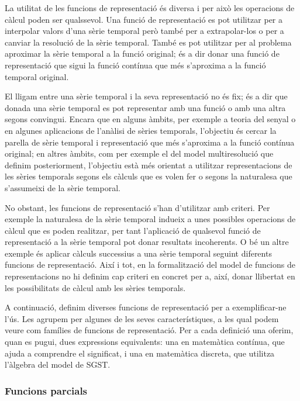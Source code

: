 La utilitat de les funcions de representació és diversa i per això les
operacions de càlcul poden ser qualssevol. Una funció de
representació es pot utilitzar per a interpolar valors d'una sèrie
temporal però també per a extrapolar-los o per a canviar la resolució
de la sèrie temporal. També es pot utilitzar per al problema aproximar
la sèrie temporal a la funció original; és a dir donar una funció de
representació que sigui la funció contínua que més s'aproxima a la
funció temporal original.


El lligam entre una sèrie temporal i la seva representació no és fix;
és a dir que donada una sèrie temporal es pot representar amb una
funció o amb una altra segons convingui.  Encara que en alguns àmbits,
per exemple a teoria del senyal o en algunes aplicacions de l'anàlisi
de sèries temporals, l'objectiu és cercar la parella de sèrie temporal
i representació que més s'aproxima a la funció contínua original; en
altres àmbits, com per exemple el del model multiresolució que definim
posteriorment, l'objectiu està més orientat a utilitzar
representacions de les sèries temporals segons els càlculs que es
volen fer o segons la naturalesa que s'assumeixi de la sèrie temporal.


No obstant, les funcions de representació s'han d'utilitzar amb
criteri. Per exemple la naturalesa de la sèrie temporal indueix a unes
possibles operacions de càlcul que es poden realitzar, per tant
l'aplicació de qualsevol funció de representació a la sèrie temporal
pot donar resultats incoherents. O bé un altre exemple és aplicar
càlculs successius a una sèrie temporal seguint diferents funcions de
representació.  Així i tot, en la formalització del model de funcions
de representacions no hi definim cap criteri en concret per a, així,
donar llibertat en les possibilitats de càlcul amb les sèries
temporals.


A continuació, definim diverses funcions de representació per a
exemplificar-ne l'ús. Les agrupem per algunes de les seves
característiques, a les qual podem veure com famílies de funcions de
representació. Per a cada definició una oferim, quan es pugui, dues
expressions equivalents: una en matemàtica contínua, que ajuda a
comprendre el significat, i una en matemàtica discreta, que utilitza
l'àlgebra del model de SGST.




\subsubsection{Funcions parcials}

